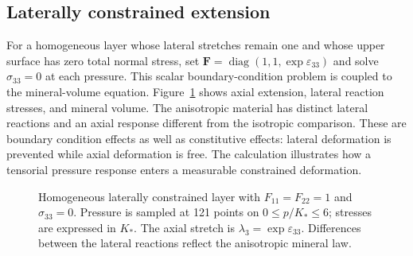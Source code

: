 \subsection{Laterally constrained extension}
For a homogeneous layer whose lateral stretches remain one and whose
upper surface has zero total normal stress, set
\(\mathbf F=\operatorname{diag}(1,1,\exp\varepsilon_{33})\) and solve
\(\sigma_{33}=0\) at each pressure. This scalar boundary-condition problem
is coupled to the mineral-volume equation. Figure~\ref{fig:spherical-layer}
shows axial extension, lateral reaction stresses, and mineral volume.
The anisotropic material has distinct lateral reactions and an axial
response different from the isotropic comparison. These are boundary
condition effects as well as constitutive effects: lateral deformation is
prevented while axial deformation is free. The calculation illustrates how
a tensorial pressure response enters a measurable constrained deformation.
\begin{figure}[htbp]
 \centering
 \caption{Homogeneous laterally constrained layer with
 \(F_{11}=F_{22}=1\) and \(\sigma_{33}=0\). Pressure is sampled at 121
 points on \(0\le p/K_*\le6\); stresses are expressed in \(K_*\).
 The axial stretch is \(\lambda_3=\exp\varepsilon_{33}\). Differences
 between the lateral reactions reflect the anisotropic mineral law.}
 \label{fig:spherical-layer}
\end{figure}
